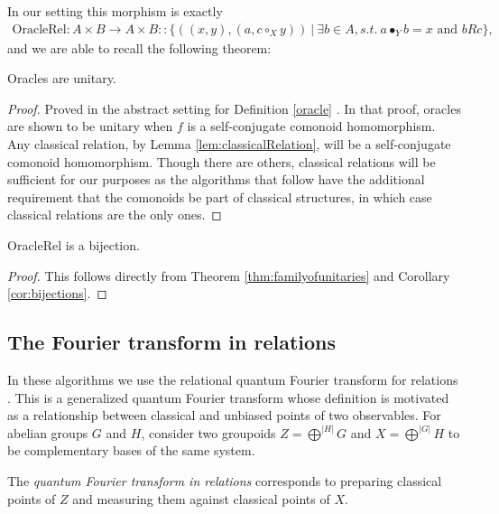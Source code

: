 \noindent In our setting this morphism is exactly
\begin{align}
\mbox{OracleRel}:A\times B\to A\times B :: \{((x,y),(a,c\circ_Xy))~|~\exists b\in A, s.t.~a\bullet_Yb=x\mbox{ and }bRc\},
\end{align}
and we are able to recall the following theorem:
\begin{theorem}
\label{thm:familyofunitaries}
Oracles are unitary.
\end{theorem}
\begin{proof}
Proved in the abstract setting for Definition \ref{oracle} .  In that proof, oracles are shown to be unitary when $f$ is a self-conjugate comonoid homomorphism. Any classical relation, by Lemma \ref{lem:classicalRelation}, will be a self-conjugate comonoid homomorphism. Though there are others, classical relations will be sufficient for our purposes as the algorithms that follow have the additional requirement that the comonoids be part of classical structures, in which case classical relations are the only ones.
\end{proof}

\begin{corollary}
OracleRel is a bijection.
\end{corollary}
\begin{proof}
This follows directly from Theorem \ref{thm:familyofunitaries} and Corollary \ref{cor:bijections}.
\end{proof}

\subsection{The Fourier transform in relations}
\label{sec:FT}

In these algorithms we use the relational quantum Fourier transform for relations  . This is a generalized quantum Fourier transform whose definition is motivated as a relationship between classical and unbiased points of two observables.  For abelian groups $G$ and $H$, consider two groupoids $Z=\bigoplus^{|H|}G$ and $X=\bigoplus^{|G|}H$ to be complementary bases of the same system.

\begin{defn}
\label{def:FTRel}
The \emph{quantum Fourier transform in relations} corresponds to preparing classical points of $Z$ and measuring them against classical points of $X$.
\end{defn}

